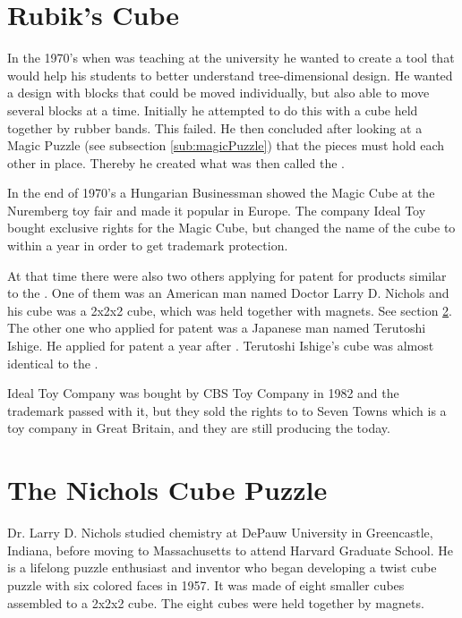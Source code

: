 \section{Rubik's Cube}


In the 1970's when \erno{} was teaching at the university he wanted to create a tool that would help his students to better understand tree-dimensional design. 
He wanted a design with blocks that could be moved individually, but also able to move several blocks at a time. 
Initially he attempted to do this with a cube held together by rubber bands. 
This failed. 
He then concluded after looking at a  Magic Puzzle (see subsection \ref{sub:magicPuzzle}) that the pieces must hold each other in place. 
Thereby he created what was then called the \mcube{}. 


In the end of 1970's a Hungarian Businessman showed the Magic Cube at the Nuremberg toy fair and made it popular in Europe. 
The company Ideal Toy bought exclusive rights for the Magic Cube, but changed the name of the cube to \rubik{} within a year in order to get trademark protection.

At that time there were also two others applying for patent for products similar to the \rubik{}.  
One of them was an American man named Doctor Larry D. Nichols and his cube was a 2x2x2 cube, which was held together with magnets. See section \ref{sec:nichols}. 
The other one who applied for patent was a Japanese man named Terutoshi Ishige. 
He applied for patent a year after \erno{}. 
Terutoshi Ishige's cube was almost identical to the \rubik{}.

Ideal Toy Company was bought by CBS Toy Company in 1982 and the trademark passed with it, but they sold the rights to \rubik{} to Seven Towns which is a toy company in Great Britain, and they are still producing the \rubik{} today.

\section{The Nichols Cube Puzzle}
\label{sec:nichols}
Dr. Larry D. Nichols studied chemistry at DePauw University in Greencastle, Indiana, before moving to Massachusetts to attend Harvard Graduate School. 
He is a lifelong puzzle enthusiast and inventor who  began developing a twist cube puzzle with six colored faces in 1957. 
It was made of eight smaller cubes assembled to a 2x2x2 cube. 
The eight cubes were held together by magnets.

